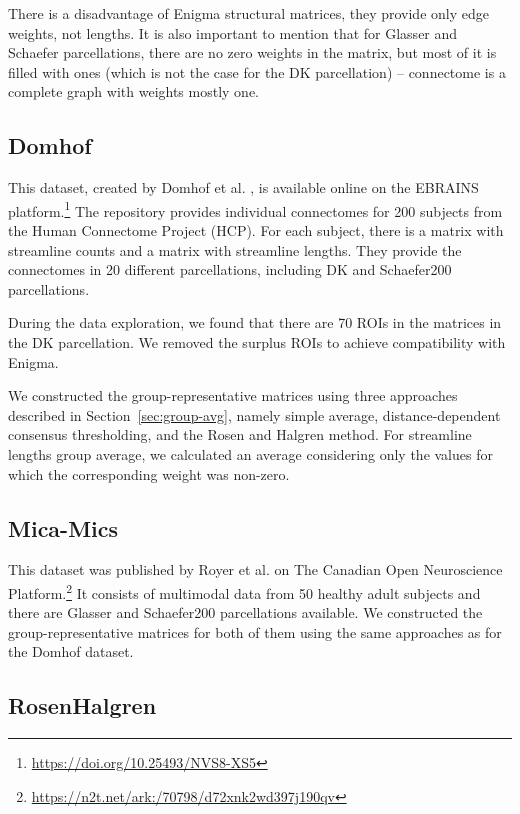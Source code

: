 There is a disadvantage of Enigma structural matrices, they provide only edge weights, not lengths. It is also important to mention that for Glasser and Schaefer parcellations, there are no zero weights in the matrix, but most of it is filled with ones (which is not the case for the DK parcellation) -- connectome is a complete graph with weights mostly one.

\subsection{Domhof}\label{sec:domhof}

This dataset, created by Domhof et al. \cite{domhof_parcellation-based_2022}, is available online on the EBRAINS platform.\footnote{\url{https://doi.org/10.25493/NVS8-XS5}} The repository provides individual connectomes for 200 subjects from the Human Connectome Project (HCP). For each subject, there is a matrix with streamline counts and a matrix with streamline lengths. They provide the connectomes in 20 different parcellations, including DK and Schaefer200 parcellations. 

During the data exploration, we found that there are 70 ROIs in the matrices in the DK parcellation. We removed the surplus ROIs to achieve compatibility with Enigma.

We constructed the group-representative matrices using three approaches described in Section~\ref{sec:group-avg}, namely simple average, distance-dependent consensus thresholding, and the Rosen and Halgren method. For streamline lengths group average, we calculated an average considering only the values for which the corresponding weight was non-zero.

\subsection{Mica-Mics}\label{sec:mica}

This dataset was published by Royer et al. \cite{royer_open_2021} on The Canadian Open Neuroscience Platform.\footnote{\url{https://n2t.net/ark:/70798/d72xnk2wd397j190qv}} It consists of multimodal data from 50 healthy adult subjects and there are Glasser and Schaefer200 parcellations available. We constructed the group-representative matrices for both of them using the same approaches as for the Domhof dataset.

\subsection{RosenHalgren}\label{sec:rhdata}


